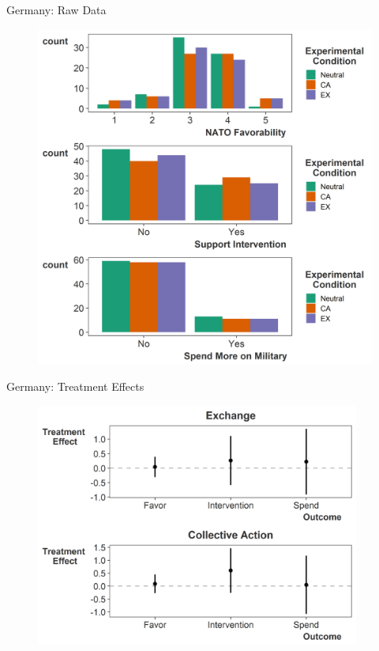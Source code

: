 \documentclass[12pt]{beamer}
\begin{document}


\begin{frame}{Germany: Raw Data}

\begin{figure}[htbp]
	\centering
		\includegraphics[height=.95\textheight]{raw-german-pres.png}
\end{figure}


\end{frame}



\begin{frame}{Germany: Treatment Effects}

\begin{figure}[htbp]
	\centering
		\includegraphics[width=0.95\textwidth]{ge-te-pres.png}
\end{figure}


\end{frame}
\end{document}
